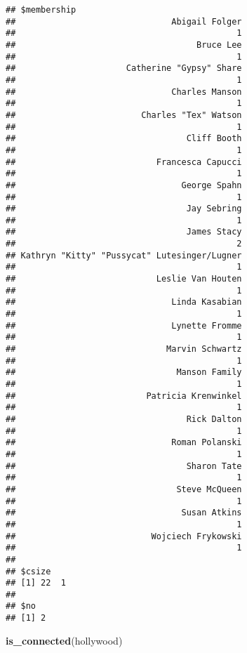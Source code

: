 \documentclass[
]{article}
\newenvironment{Shaded}{\begin{snugshade}}{\end{snugshade}}
\newcommand{\KeywordTok}[1]{\textcolor[rgb]{0.13,0.29,0.53}{\textbf{#1}}}
\newcommand{\NormalTok}[1]{#1}
\begin{document}
\begin{verbatim}
## $membership
##                               Abigail Folger 
##                                            1 
##                                    Bruce Lee 
##                                            1 
##                      Catherine "Gypsy" Share 
##                                            1 
##                               Charles Manson 
##                                            1 
##                         Charles "Tex" Watson 
##                                            1 
##                                  Cliff Booth 
##                                            1 
##                            Francesca Capucci 
##                                            1 
##                                 George Spahn 
##                                            1 
##                                  Jay Sebring 
##                                            1 
##                                  James Stacy 
##                                            2 
## Kathryn "Kitty" "Pussycat" Lutesinger/Lugner 
##                                            1 
##                            Leslie Van Houten 
##                                            1 
##                               Linda Kasabian 
##                                            1 
##                               Lynette Fromme 
##                                            1 
##                              Marvin Schwartz 
##                                            1 
##                                Manson Family 
##                                            1 
##                          Patricia Krenwinkel 
##                                            1 
##                                  Rick Dalton 
##                                            1 
##                               Roman Polanski 
##                                            1 
##                                  Sharon Tate 
##                                            1 
##                                Steve McQueen 
##                                            1 
##                                 Susan Atkins 
##                                            1 
##                           Wojciech Frykowski 
##                                            1 
## 
## $csize
## [1] 22  1
## 
## $no
## [1] 2
\end{verbatim}

\begin{Shaded}
\begin{Highlighting}[]
\KeywordTok{is_connected}\NormalTok{(hollywood)}
\end{Highlighting}
\end{Shaded}
\end{document}
